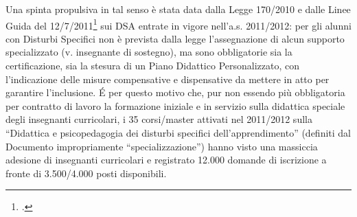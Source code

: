 Una spinta propulsiva in tal senso è stata data dalla Legge 170/2010 e dalle Linee Guida del
12/7/2011\footcite{LineGuida2011} sui DSA entrate in vigore nell'a.s. 2011/2012: per gli alunni con Disturbi Specifici non è
prevista dalla legge l'assegnazione di alcun supporto specializzato (v. insegnante di sostegno), ma
sono obbligatorie sia la certificazione, sia la stesura di un Piano Didattico Personalizzato, con
l'indicazione delle misure compensative e dispensative da mettere in atto per garantire
l'inclusione. \'{E} per questo motivo che, pur non essendo più obbligatoria per contratto di lavoro la
formazione iniziale e in servizio sulla didattica speciale degli insegnanti curricolari, i 35
corsi/master attivati nel 2011/2012 sulla “Didattica e psicopedagogia dei disturbi specifici
dell'apprendimento” (definiti dal Documento impropriamente “specializzazione”) hanno visto
una massiccia adesione di insegnanti curricolari e registrato 12.000 domande di iscrizione a
fronte di 3.500/4.000 posti disponibili.

